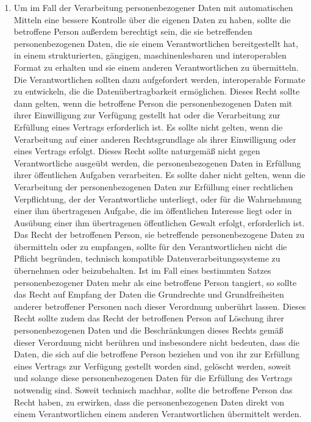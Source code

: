 \begin{enumerate}
   \item Um im Fall der Verarbeitung personenbezogener Daten mit automatischen Mitteln eine bessere Kontrolle über die
    eigenen Daten zu haben, sollte die betroffene Person außerdem berechtigt sein, die sie betreffenden
    personenbezogenen Daten, die sie einem Verantwortlichen bereitgestellt hat, in einem strukturierten, gängigen,
    maschinenlesbaren und interoperablen Format zu erhalten und sie einem anderen Verantwortlichen zu übermitteln. Die
    Verantwortlichen sollten dazu aufgefordert werden, interoperable Formate zu entwickeln, die die
    Datenübertragbarkeit ermöglichen. Dieses Recht sollte dann gelten, wenn die betroffene Person die personenbezogenen
    Daten mit ihrer Einwilligung zur Verfügung gestellt hat oder die Verarbeitung zur Erfüllung eines Vertrags
    erforderlich ist. Es sollte nicht gelten, wenn die Verarbeitung auf einer anderen Rechtsgrundlage als ihrer
    Einwilligung oder eines Vertrags erfolgt. Dieses Recht sollte naturgemäß nicht gegen Verantwortliche ausgeübt
    werden, die personenbezogenen Daten in Erfüllung ihrer öffentlichen Aufgaben verarbeiten. Es sollte daher nicht
    gelten, wenn die Verarbeitung der personenbezogenen Daten zur Erfüllung einer rechtlichen Verpflichtung, der der
    Verantwortliche unterliegt, oder für die Wahrnehmung einer ihm übertragenen Aufgabe, die im öffentlichen Interesse
    liegt oder in Ausübung einer ihm übertragenen öffentlichen Gewalt erfolgt, erforderlich ist. Das Recht der
    betroffenen Person, sie betreffende personenbezogene Daten zu übermitteln oder zu empfangen, sollte für den
    Verantwortlichen nicht die Pflicht begründen, technisch kompatible Datenverarbeitungssysteme zu übernehmen oder
    beizubehalten. Ist im Fall eines bestimmten Satzes personenbezogener Daten mehr als eine betroffene Person
    tangiert, so sollte das Recht auf Empfang der Daten die Grundrechte und Grundfreiheiten anderer betroffener
    Personen nach dieser Verordnung unberührt lassen. Dieses Recht sollte zudem das Recht der betroffenen Person auf
    Löschung ihrer personenbezogenen Daten und die Beschränkungen dieses Rechts gemäß dieser Verordnung nicht berühren
    und insbesondere nicht bedeuten, dass die Daten, die sich auf die betroffene Person beziehen und von ihr zur
    Erfüllung eines Vertrags zur Verfügung gestellt worden sind, gelöscht werden, soweit und solange diese
    personenbezogenen Daten für die Erfüllung des Vertrags notwendig sind. Soweit technisch machbar, sollte die
    betroffene Person das Recht haben, zu erwirken, dass die personenbezogenen Daten direkt von einem Verantwortlichen
    einem anderen Verantwortlichen übermittelt werden.%
   \label{eg:68}
   

\end{enumerate}
